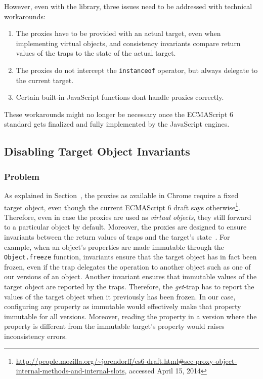 However, even with the library, three issues need to be addressed with technical workarounds:

\begin{enumerate}
    \item The proxies have to be provided with an actual target, even when implementing virtual objects, and consistency invariants compare return values of the traps to the state of the actual target. 
    \item The proxies do not intercept the \lstinline{instanceof} operator, but always delegate to the current target.
    \item Certain built-in JavaScript functions dont handle proxies correctly.
\end{enumerate}

These workarounds might no longer be necessary once the ECMAScript 6 standard gets finalized and fully implemented by the JavaScript engines. 


\subsection{Disabling Target Object Invariants}

\subsubsection{Problem}
As explained in Section~\label{subsec:IMPLEMENTATION:1.1}, the proxies as available in Chrome require a fixed target object, even though the current ECMAScript 6 draft says otherwise\footnote{\url{http://people.mozilla.org/~jorendorff/es6-draft.html\#sec-proxy-object-internal-methods-and-internal-slots}, accessed April 15, 2014}.
Therefore, even in case the proxies are used as \emph{virtual objects}, they still forward to a particular object by default.
Moreover, the proxies are designed to ensure invariants between the return values of traps and the target's state~\cite{Cutsem2013TRP}.
For example, when an object's properties are made immutable through the \lstinline{Object.freeze} function, invariants ensure that the target object has in fact been frozen, even if the trap delegates the operation to another object such as one of our versions of an object.
Another invariant ensures that immutable values of the target object are reported by the traps.
Therefore, the \emph{get}-trap has to report the values of the target object when it previously has been frozen.
In our case, configuring any property as immutable would effectively make that property immutable for all versions.
Moreover, reading the property in a version where the property is different from the immutable target's property would raises inconsistency errors.

